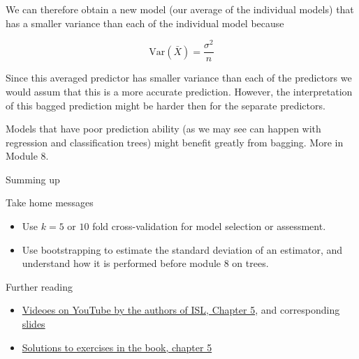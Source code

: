\documentclass[10pt,ignorenonframetext,]{beamer}
\providecommand{\tightlist}{%
  \setlength{\itemsep}{0pt}\setlength{\parskip}{0pt}}
\begin{document}
\begin{frame}

We can therefore obtain a new model (our average of the individual
models) that has a smaller variance than each of the individual model
because

\[\text{Var}(\bar{X})=\frac{\sigma^2}{n}\]

Since this averaged predictor has smaller variance than each of the
predictors we would assum that this is a more accurate prediction.
However, the interpretation of this bagged prediction might be harder
then for the separate predictors.

Models that have poor prediction ability (as we may see can happen with
regression and classification trees) might benefit greatly from bagging.
More in Module 8.

\end{frame}

\begin{frame}{Summing up}

\begin{block}{Take home messages}

\begin{itemize}
\tightlist
\item
  Use \(k=5\) or \(10\) fold cross-validation for model selection or
  assessment.
\item
  Use bootstrapping to estimate the standard deviation of an estimator,
  and understand how it is performed before module 8 on trees.
\end{itemize}

\end{block}

\end{frame}

\begin{frame}{Further reading}

\begin{itemize}
\tightlist
\item
  \href{https://www.youtube.com/playlist?list=PL5-da3qGB5IA6E6ZNXu7dp89_uv8yocmf}{Videoes
  on YouTube by the authors of ISL, Chapter 5}, and corresponding
  \href{https://lagunita.stanford.edu/c4x/HumanitiesScience/StatLearning/asset/cv_boot.pdf}{slides}
\item
  \href{https://rstudio-pubs-static.s3.amazonaws.com/65561_43c0eaaa8565414eae333b47038f716c.html}{Solutions
  to exercises in the book, chapter 5}
\end{itemize}

\end{frame}
\end{document}
